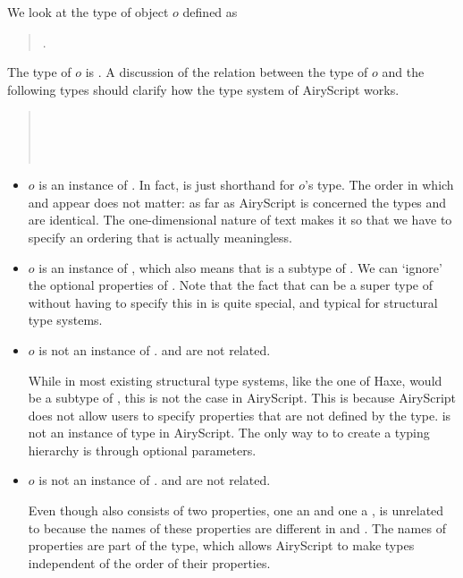 We look at the type of object $o$ defined as
\begin{quote}
  .
\end{quote}
The type of $o$ is . A discussion of the relation between
the type of $o$ and the following types should clarify how the type system of
AiryScript works.
\begin{quote}
  \\
  \\
  \\
\end{quote}
\begin{itemize}
  \item $o$ is an instance of . In fact,  is just shorthand for
    $o$’s type. The order in which  and  appear does not matter:
    as far as AiryScript is concerned the types 
    and  are identical. The one-dimensional nature of text
    makes it so that we have to specify an ordering that is actually
    meaningless.

  \item $o$ is an instance of , which also means that  is a subtype
    of .  We can ‘ignore’ the optional properties of . Note that
    the fact that  can be a super type of  without having to specify
    this in  is quite special, and typical for structural type systems.

  \item $o$ is not an instance of .  and  are not related.

    While in most existing structural type systems, like the one of Haxe, 
    would be a subtype of , this is not the case in AiryScript. This is
    because AiryScript does not allow users to specify properties that are not
    defined by the type.  is not an instance of type  in AiryScript. The only way to to create a typing
    hierarchy is through optional parameters.

  \item $o$ is not an instance of .  and  are not related.

    Even though  also consists of two properties, one an  and one
    a ,  is unrelated to  because the names of these
    properties are different in  and . The names of properties are
    part of the type, which allows AiryScript to make types independent of the
    order of their properties.
\end{itemize}

